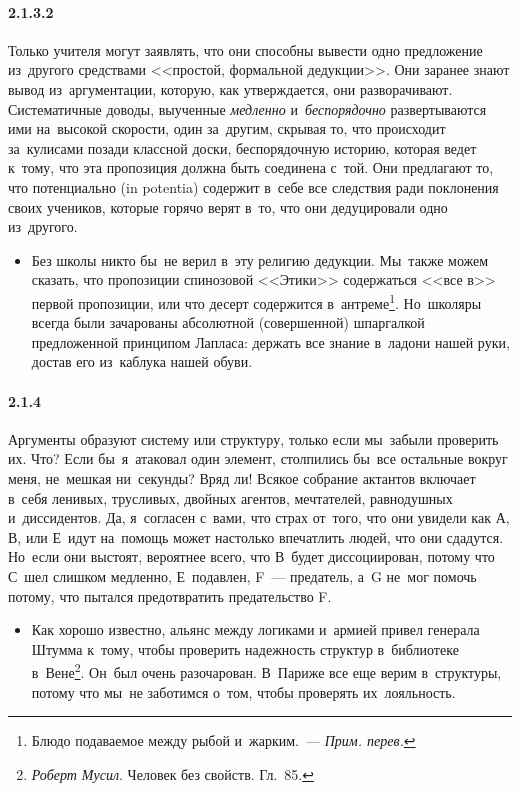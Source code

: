 \paragraph{2.1.3.2}\hypertarget{par:2.1.3.2}{} Только учителя могут заявлять, что они способны вывести одно предложение из~другого средствами <<простой, формальной дедукции>>. Они заранее знают вывод из~аргументации, которую, как утверждается, они разворачивают. Систематичные доводы, выученные {\itshape медленно} и~{\itshape беспорядочно} развертываются ими на~высокой скорости, один за~другим, скрывая то, что происходит за~кулисами позади классной доски, беспорядочную историю, которая ведет к~тому, что эта пропозиция должна быть соединена с~той. Они
предлагают то, что потенциально (in potentia) содержит в~себе все следствия ради поклонения своих учеников, которые горячо верят в~то, что они дедуцировали одно из~другого.
	\begin{itemize}
	\item Без школы никто бы~не верил в~эту религию дедукции. Мы~также можем сказать, что пропозиции спинозовой <<Этики>> содержаться <<все в>> первой пропозиции, или что десерт содержится в~антреме\footnote{Блюдо подаваемое между рыбой и~жарким.~--- {\itshape Прим. перев.}}. Но~школяры всегда были зачарованы абсолютной (совершенной) шпаргалкой предложенной принципом Лапласа: держать все знание в~ладони нашей руки, достав его из~каблука нашей обуви.
	\end{itemize}

\paragraph{2.1.4}\hypertarget{par:2.1.4}{} Аргументы образуют систему или структуру, только если мы~забыли проверить их. Что? Если бы~я~атаковал один элемент, столпились бы~все остальные вокруг меня, не~мешкая ни~секунды? Вряд ли! Всякое собрание актантов включает в~себя ленивых, трусливых, двойных агентов, мечтателей, равнодушных и~диссидентов. Да, я~согласен с~вами, что страх от~того, что они увидели как А, В, или Е~идут на~помощь может настолько впечатлить людей, что они сдадутся. Но~если они выстоят, вероятнее всего, что В~будет
диссоциирован, потому что С~шел слишком медленно, Е~подавлен, F~--- предатель, а~G не~мог помочь потому, что пытался предотвратить предательство F. 
	\begin{itemize}
	\item 
	Как хорошо известно, альянс между логиками и~армией привел генерала Штумма к~тому, чтобы проверить надежность структур в~библиотеке в~Вене\footnote{{\itshape Роберт Мусил}. Человек без свойств. Гл.~85.}. Он~был очень разочарован. В~Париже все еще верим в~структуры, потому что мы~не заботимся о~том, чтобы проверять их~лояльность.
	\end{itemize}

